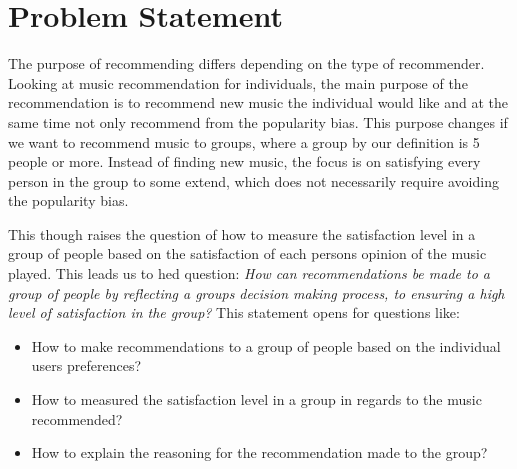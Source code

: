 \section{Problem Statement}
The purpose of recommending differs depending on the type of recommender. Looking at music recommendation for individuals, the main purpose of the recommendation is to recommend new music the individual would like and at the same time not only recommend from the popularity bias. This purpose changes if we want to recommend music to groups, where a group by our definition is 5 people or more. Instead of finding new music, the focus is on satisfying every person in the group to some extend, which does not necessarily require avoiding the popularity bias. 

This though raises the question of how to measure the satisfaction level in a group of people based on the satisfaction of each persons opinion of the music played. This leads us to hed question: 
\textit{How can recommendations be made to a group of people by reflecting a groups decision making process, to ensuring a high level of satisfaction in the group?} This statement opens for questions like:
\begin{itemize}
\item How to make recommendations to a group of people based on the individual users preferences?
\item How to measured the satisfaction level in a group in regards to the music recommended?
\item How to explain the reasoning for the recommendation made to the group?
\end{itemize}